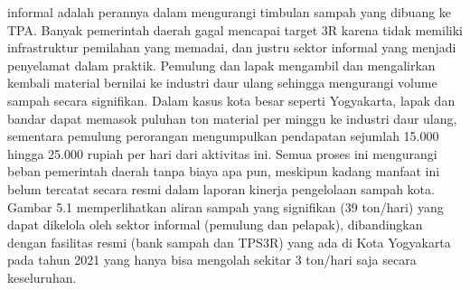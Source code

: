 \documentclass[
  letterpaper,
  DIV=11,
  numbers=noendperiod]{scrreprt}
\begin{document}
informal adalah perannya dalam mengurangi timbulan sampah yang dibuang
ke TPA. Banyak pemerintah daerah gagal mencapai target 3R karena tidak
memiliki infrastruktur pemilahan yang memadai, dan justru sektor
informal yang menjadi penyelamat dalam praktik. Pemulung dan lapak
mengambil dan mengalirkan kembali material bernilai ke industri daur
ulang sehingga mengurangi volume sampah secara signifikan. Dalam kasus
kota besar seperti Yogyakarta, lapak dan bandar dapat memasok puluhan
ton material per minggu ke industri daur ulang, sementara pemulung
perorangan mengumpulkan pendapatan sejumlah 15.000 hingga 25.000 rupiah
per hari dari aktivitas ini. Semua proses ini mengurangi beban
pemerintah daerah tanpa biaya apa pun, meskipun kadang manfaat ini belum
tercatat secara resmi dalam laporan kinerja pengelolaan sampah kota.
Gambar 5.1 memperlihatkan aliran sampah yang signifikan (39 ton/hari)
yang dapat dikelola oleh sektor informal (pemulung dan pelapak),
dibandingkan dengan fasilitas resmi (bank sampah dan TPS3R) yang ada di
Kota Yogyakarta pada tahun 2021 yang hanya bisa mengolah sekitar 3
ton/hari saja secara keseluruhan.
\end{document}
